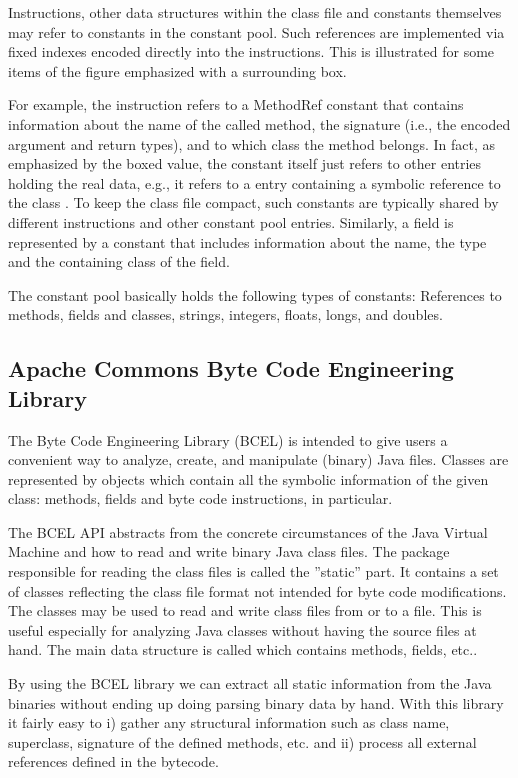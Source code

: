 Instructions, other data structures within the class file and constants
themselves may refer to constants in the constant pool. Such references are
implemented via fixed indexes encoded directly into the instructions. This is
illustrated for some items of the figure emphasized with a surrounding box.

For example, the  instruction refers to a MethodRef constant that
contains information about the name of the called method, the signature (i.e.,
the encoded argument and return types), and to which class the method belongs.
In fact, as emphasized by the boxed value, the  constant itself just
refers to other entries holding the real data, e.g., it refers to a
 entry containing a symbolic reference to the class
. To keep the class file compact, such constants are
typically shared by different instructions and other constant pool entries.
Similarly, a field is represented by a  constant that includes
information about the name, the type and the containing class of the field.

The constant pool basically holds the following types of constants: References
to methods, fields and classes, strings, integers, floats, longs, and doubles.


\subsection{Apache Commons Byte Code Engineering Library} 
The Byte Code Engineering Library (BCEL) \cite{BCEL} is intended to give users a
convenient way to analyze, create, and manipulate (binary) Java files. Classes
are represented by objects which contain all the symbolic information of the
given class: methods, fields and byte code instructions, in particular.

The BCEL API abstracts from the concrete circumstances of the Java Virtual
Machine and how to read and write binary Java class files. The package 
responsible for reading the class files is called the ''static'' part.
It contains a set of classes reflecting the class file format not intended for
byte code modifications. The classes may be used to read and write class files
from or to a file. This is useful especially for analyzing Java classes without
having the source files at hand. The main data structure is called
 which contains methods, fields, etc..

By using the BCEL library we can extract all static information from the Java binaries without
ending up doing parsing binary data by hand. With this library it fairly easy to
i) gather any structural information such as class name, superclass, signature
of the defined methods, etc. and ii) process all external references defined in the 
bytecode.


